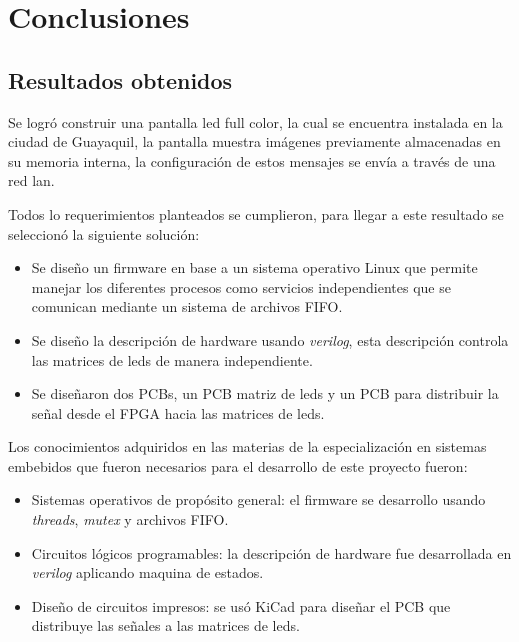 
\chapter{Conclusiones} %

\label{Chapter5} %



\section{Resultados obtenidos}




Se logró construir una pantalla led full color, la cual se encuentra instalada en la ciudad de Guayaquil, la pantalla muestra imágenes previamente almacenadas en su memoria interna, la configuración de estos mensajes se envía a través de una red lan.

Todos lo requerimientos planteados se cumplieron, para llegar a este resultado se seleccionó la siguiente solución:
\begin{itemize}
\item Se diseño un firmware en base a un sistema operativo Linux que permite manejar los diferentes procesos como servicios independientes que se comunican mediante un sistema de archivos FIFO.
\item Se diseño la descripción de hardware usando \textit{verilog},  esta descripción controla las matrices de leds de manera independiente.
\item Se diseñaron dos PCBs, un PCB matriz de leds y un PCB para distribuir la señal desde el FPGA hacia las matrices de leds.
\end{itemize}
Los conocimientos adquiridos en las materias de la especialización en sistemas embebidos que fueron necesarios para el desarrollo de este proyecto fueron:
\begin{itemize}
\item Sistemas operativos de propósito general: el firmware se desarrollo usando \textit{threads}, \textit{mutex} y archivos FIFO.
\item Circuitos lógicos programables: la descripción de hardware fue desarrollada en \textit{verilog} aplicando maquina de estados.
\item Diseño de circuitos impresos: se usó KiCad para diseñar el PCB que distribuye las señales a las matrices de leds.
\end{itemize}


